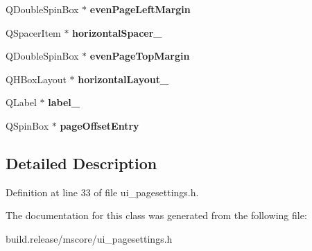 \begin{DoxyCompactItemize}
Q\+Double\+Spin\+Box $\ast$ {\bfseries even\+Page\+Left\+Margin}
\item 
\mbox{\label{class_ui___page_settings_base_a2439462dc9c4918efe54811a0594ad35}} 
Q\+Spacer\+Item $\ast$ {\bfseries horizontal\+Spacer\+\_}
\item 
\mbox{\label{class_ui___page_settings_base_ab14bca2135edbdab21c667d394018da5}} 
Q\+Double\+Spin\+Box $\ast$ {\bfseries even\+Page\+Top\+Margin}
\item 
\mbox{\label{class_ui___page_settings_base_abd05cb8fce7462e62b2be14bae8b519f}} 
Q\+H\+Box\+Layout $\ast$ {\bfseries horizontal\+Layout\+\_}
\item 
\mbox{\label{class_ui___page_settings_base_ac66775a95f4060165e411aafcc9d20a0}} 
Q\+Label $\ast$ {\bfseries label\+\_}
\item 
\mbox{\label{class_ui___page_settings_base_aa973d6011175de5fe4d11af8e5e7c876}} 
Q\+Spin\+Box $\ast$ {\bfseries page\+Offset\+Entry}
\end{DoxyCompactItemize}


\subsection{Detailed Description}


Definition at line 33 of file ui\+\_\+pagesettings.\+h.



The documentation for this class was generated from the following file\+:\begin{DoxyCompactItemize}
\item 
build.\+release/mscore/ui\+\_\+pagesettings.\+h\end{DoxyCompactItemize}
